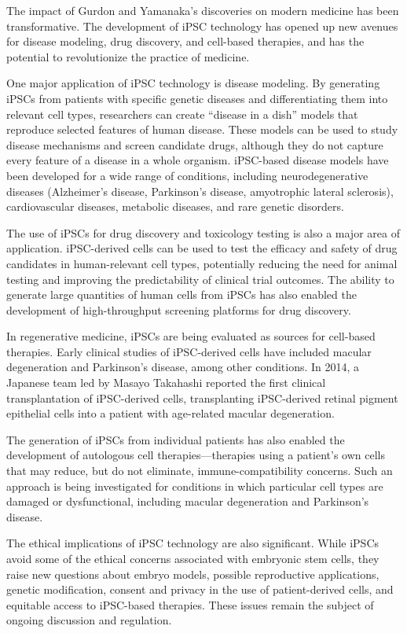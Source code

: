 The impact of Gurdon and Yamanaka's discoveries on modern medicine has been transformative. The development of iPSC technology has opened up new avenues for disease modeling, drug discovery, and cell-based therapies, and has the potential to revolutionize the practice of medicine.

One major application of iPSC technology is disease modeling. By generating iPSCs from patients with specific genetic diseases and differentiating them into relevant cell types, researchers can create ``disease in a dish'' models that reproduce selected features of human disease. These models can be used to study disease mechanisms and screen candidate drugs, although they do not capture every feature of a disease in a whole organism. iPSC-based disease models have been developed for a wide range of conditions, including neurodegenerative diseases (Alzheimer's disease, Parkinson's disease, amyotrophic lateral sclerosis), cardiovascular diseases, metabolic diseases, and rare genetic disorders.

The use of iPSCs for drug discovery and toxicology testing is also a major area of application. iPSC-derived cells can be used to test the efficacy and safety of drug candidates in human-relevant cell types, potentially reducing the need for animal testing and improving the predictability of clinical trial outcomes. The ability to generate large quantities of human cells from iPSCs has also enabled the development of high-throughput screening platforms for drug discovery.

In regenerative medicine, iPSCs are being evaluated as sources for cell-based therapies. Early clinical studies of iPSC-derived cells have included macular degeneration and Parkinson's disease, among other conditions. In 2014, a Japanese team led by Masayo Takahashi reported the first clinical transplantation of iPSC-derived cells, transplanting iPSC-derived retinal pigment epithelial cells into a patient with age-related macular degeneration.

The generation of iPSCs from individual patients has also enabled the development of autologous cell therapies---therapies using a patient's own cells that may reduce, but do not eliminate, immune-compatibility concerns. Such an approach is being investigated for conditions in which particular cell types are damaged or dysfunctional, including macular degeneration and Parkinson's disease.

The ethical implications of iPSC technology are also significant. While iPSCs avoid some of the ethical concerns associated with embryonic stem cells, they raise new questions about embryo models, possible reproductive applications, genetic modification, consent and privacy in the use of patient-derived cells, and equitable access to iPSC-based therapies. These issues remain the subject of ongoing discussion and regulation.


